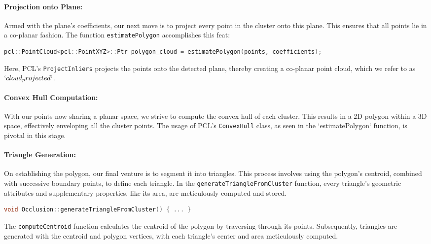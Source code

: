 \documentclass[11pt, a4paper,oneside,chapterprefix=false]{scrbook}
\begin{document}
\paragraph{Projection onto Plane:} Armed with the plane's coefficients, our next move is to project every point in the cluster onto this plane. This ensures that all points lie in a co-planar fashion. The function \texttt{estimatePolygon} accomplishes this feat:

\begin{lstlisting}[language=C++, caption=Projecting Points onto Plane]
pcl::PointCloud<pcl::PointXYZ>::Ptr polygon_cloud = estimatePolygon(points, coefficients);
\end{lstlisting}

Here, PCL's \texttt{ProjectInliers} projects the points onto the detected plane, thereby creating a co-planar point cloud, which we refer to as $`cloud_projected`$.

\paragraph{Convex Hull Computation:} With our points now sharing a planar space, we strive to compute the convex hull of each cluster. This results in a 2D polygon within a 3D space, effectively enveloping all the cluster points. The usage of PCL's \texttt{ConvexHull} class, as seen in the `estimatePolygon` function, is pivotal in this stage.

\paragraph{Triangle Generation:} On establishing the polygon, our final venture is to segment it into triangles. This process involves using the polygon's centroid, combined with successive boundary points, to define each triangle. In the \texttt{generateTriangleFromCluster} function, every triangle's geometric attributes and supplementary properties, like its area, are meticulously computed and stored.

\begin{lstlisting}[language=C++, caption=Triangle Generation from Polygons]
void Occlusion::generateTriangleFromCluster() { ... }
\end{lstlisting}

The \texttt{computeCentroid} function calculates the centroid of the polygon by traversing through its points. Subsequently, triangles are generated with the centroid and polygon vertices, with each triangle's center and area meticulously computed.
\end{document}
